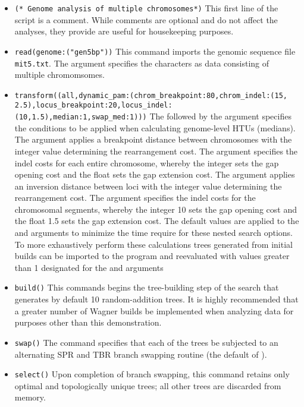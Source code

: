 \begin{itemize}
\item \texttt{(* Genome analysis of multiple chromosomes*)} This first line of the script is a comment. While comments are optional and do not affect the analyses, they provide are useful for housekeeping purposes.
\item \texttt{read(genome:("gen5bp"))} This command imports the genomic sequence file \texttt{mit5.txt}. The argument  specifies the characters as data consisting of multiple chromomsomes.
\item \texttt{transform((all,dynamic\_pam:(chrom\_breakpoint:80,chrom\_indel:(15, 2.5),locus\_breakpoint:20,locus\_indel:(10,1.5),median:1,swap\_med:1)))}  The  followed by the argument  specifies the conditions to be applied when calculating genome-level HTUs (medians). The argument  applies a breakpoint distance between chromosomes with the integer value determining the rearrangement cost. The argument  specifies the indel costs for each entire chromosome, whereby the integer sets the gap opening cost and the float sets the gap extension cost.  The argument  applies an inversion distance between loci with the integer value determining the rearrangement cost. The argument  specifies the indel costs for the chromosomal segments, whereby the integer 10 sets the gap opening cost and the float 1.5 sets the gap extension cost.  The default values are applied to the  and  arguments to minimize the time require for these nested search options.   To more exhaustively perform these calculations trees generated from initial builds can be imported to the program and reevaluated with values greater than 1 designated for the  and  arguments
\item \texttt{build()} This commands begins the tree-building step of the search that generates by default 10 random-addition trees.  It is highly recommended that a greater number of Wagner builds be implemented when analyzing data for purposes other than this demonstration.
\item \texttt{swap()} The  command specifies that each of the trees be subjected to an alternating SPR and TBR branch swapping routine (the default of \poy).
\item \texttt{select()} Upon completion of branch swapping, this command retains only optimal and topologically unique trees; all other trees are discarded from memory. 

\end{itemize}
